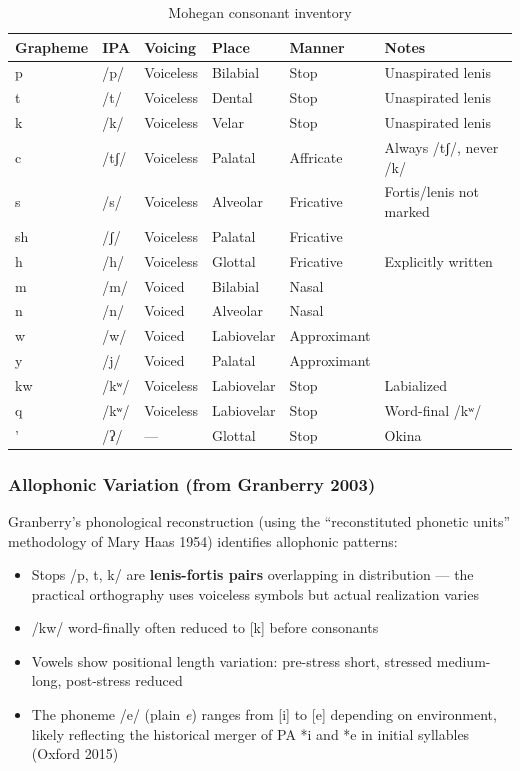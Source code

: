 \begin{table}[h]
\centering
\begin{tabular}{llllll}
\toprule
Grapheme & IPA & Voicing & Place & Manner & Notes \\
\midrule
p & /p/ & Voiceless & Bilabial & Stop & Unaspirated lenis \\
t & /t/ & Voiceless & Dental & Stop & Unaspirated lenis \\
k & /k/ & Voiceless & Velar & Stop & Unaspirated lenis \\
c & /tʃ/ & Voiceless & Palatal & Affricate & Always /tʃ/, never /k/ \\
s & /s/ & Voiceless & Alveolar & Fricative & Fortis/lenis not marked \\
sh & /ʃ/ & Voiceless & Palatal & Fricative & \\
h & /h/ & Voiceless & Glottal & Fricative & Explicitly written \\
m & /m/ & Voiced & Bilabial & Nasal & \\
n & /n/ & Voiced & Alveolar & Nasal & \\
w & /w/ & Voiced & Labiovelar & Approximant & \\
y & /j/ & Voiced & Palatal & Approximant & \\
kw & /kʷ/ & Voiceless & Labiovelar & Stop & Labialized \\
q & /kʷ/ & Voiceless & Labiovelar & Stop & Word-final /kʷ/ \\
' & /ʔ/ & --- & Glottal & Stop & Okina \\
\bottomrule
\end{tabular}
\caption{Mohegan consonant inventory}
\label{tab:1364-consonants}
\end{table}

\subsubsection{Allophonic Variation (from Granberry 2003)}

Granberry's phonological reconstruction (using the ``reconstituted phonetic
units'' methodology of Mary Haas 1954) identifies allophonic patterns:

\begin{itemize}
  \item Stops /p, t, k/ are \textbf{lenis-fortis pairs} overlapping in
    distribution --- the practical orthography uses voiceless symbols but
    actual realization varies
  \item /kw/ word-finally often reduced to [k] before consonants
  \item Vowels show positional length variation: pre-stress short, stressed
    medium-long, post-stress reduced
  \item The phoneme /e/ (plain \textit{e}) ranges from [i] to [e] depending
    on environment, likely reflecting the historical merger of PA *i and *e
    in initial syllables (Oxford 2015)
\end{itemize}

